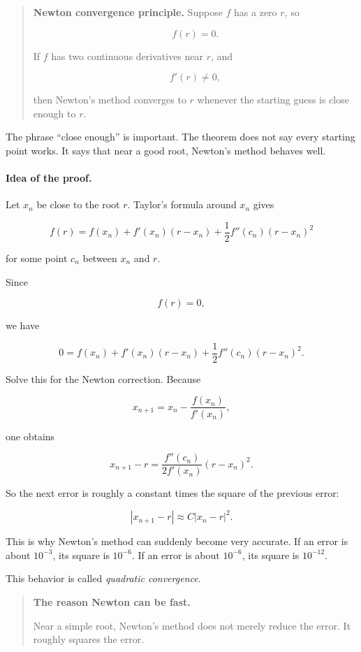 \begin{quote}
\textbf{Newton convergence principle.}
Suppose \(f\) has a zero \(r\), so

\[
f(r)=0.
\]

If \(f\) has two continuous derivatives near \(r\), and

\[
f'(r)\neq0,
\]

then Newton's method converges to \(r\) whenever the starting guess is close enough
to \(r\).
\end{quote}

The phrase ``close enough'' is important.  The theorem does not say every starting
point works.  It says that near a good root, Newton's method behaves well.

\paragraph{Idea of the proof.}
Let \(x_n\) be close to the root \(r\).  Taylor's formula around \(x_n\) gives

\[
f(r)
=
f(x_n)+f'(x_n)(r-x_n)
+
\frac12 f''(c_n)(r-x_n)^2
\]

for some point \(c_n\) between \(x_n\) and \(r\).

Since

\[
f(r)=0,
\]

we have

\[
0
=
f(x_n)+f'(x_n)(r-x_n)
+
\frac12 f''(c_n)(r-x_n)^2.
\]

Solve this for the Newton correction.  Because

\[
x_{n+1}=x_n-\frac{f(x_n)}{f'(x_n)},
\]

one obtains

\[
x_{n+1}-r
=
\frac{f''(c_n)}{2f'(x_n)}(r-x_n)^2.
\]

So the next error is roughly a constant times the square of the previous error:

\[
\boxed{
|x_{n+1}-r|\approx C|x_n-r|^2.
}
\]

This is why Newton's method can suddenly become very accurate.  If an error is
about \(10^{-3}\), its square is \(10^{-6}\).  If an error is about \(10^{-6}\), its square
is \(10^{-12}\).

This behavior is called \emph{quadratic convergence}.

\begin{quote}
\textbf{The reason Newton can be fast.}

Near a simple root, Newton's method does not merely reduce the error.  It roughly
squares the error.
\end{quote}

